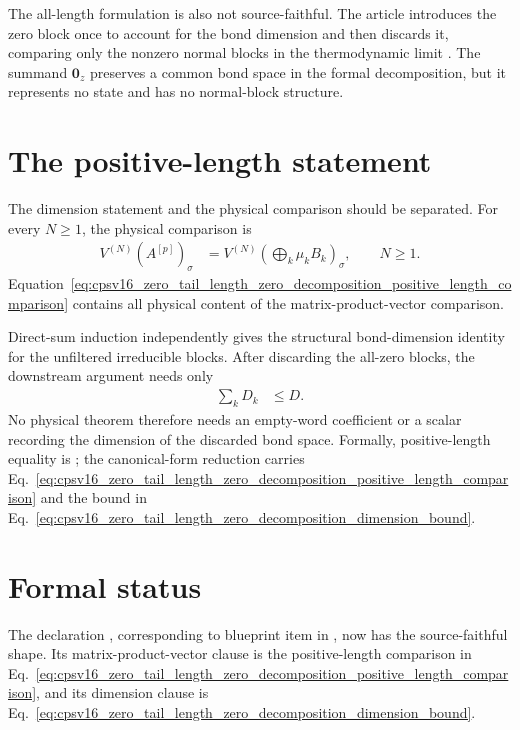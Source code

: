 \documentclass{article}
\newcommand{\MPV}[2]{V^{(#1)}\!\left(#2\right)}
\begin{document}
The all-length formulation is also not source-faithful. The article introduces
the zero block once to account for the bond dimension and then discards it,
comparing only the nonzero normal blocks in the thermodynamic limit
\cite[Section~2.3]{Cirac2016MPDO_arXiv}. The summand $\mathbf 0_z$ preserves a
common bond space in the formal decomposition, but it represents no state and
has no normal-block structure.

\section{The positive-length statement}

The dimension statement and the physical comparison should be separated. For
every $N\geq1$, the physical comparison is
\begin{align}
    \MPV{N}{A^{[p]}}_\sigma
        &= \MPV{N}{\textstyle\bigoplus_k\mu_k B_k}_\sigma,
        \qquad N\geq1.
    \label{eq:cpsv16_zero_tail_length_zero_decomposition_positive_length_comparison}
\end{align}
Equation~\ref{eq:cpsv16_zero_tail_length_zero_decomposition_positive_length_comparison}
contains all physical content of the matrix-product-vector comparison.

Direct-sum induction independently gives the structural bond-dimension
identity for the unfiltered irreducible blocks. After discarding the all-zero
blocks, the downstream argument needs only
\begin{align}
    \sum_k D_k
        &\leq D.
    \label{eq:cpsv16_zero_tail_length_zero_decomposition_dimension_bound}
\end{align}
No physical theorem therefore needs an empty-word coefficient or a scalar
recording the dimension of the discarded bond space. Formally, positive-length
equality is ; the canonical-form reduction carries
Eq.~\ref{eq:cpsv16_zero_tail_length_zero_decomposition_positive_length_comparison}
and the bound in
Eq.~\ref{eq:cpsv16_zero_tail_length_zero_decomposition_dimension_bound}.

\section{Formal status}

The declaration
, corresponding to
blueprint item  in
, now has the source-faithful
shape. Its matrix-product-vector clause is the positive-length comparison in
Eq.~\ref{eq:cpsv16_zero_tail_length_zero_decomposition_positive_length_comparison},
and its dimension clause is
Eq.~\ref{eq:cpsv16_zero_tail_length_zero_decomposition_dimension_bound}.
\end{document}
